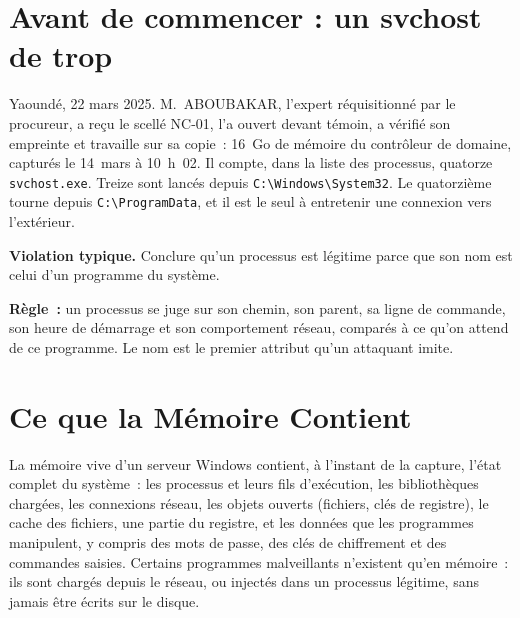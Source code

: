 \bigskip

\section*{Avant de commencer : un svchost de trop}

Yaoundé, 22 mars 2025. M.~ABOUBAKAR, l'expert réquisitionné par le
procureur, a reçu le scellé NC-01, l'a ouvert devant témoin, a vérifié son
empreinte et travaille sur sa copie~: 16~Go de mémoire du contrôleur de
domaine, capturés le 14~mars à 10~h~02. Il compte, dans la liste des
processus, quatorze \texttt{svchost.exe}. Treize sont lancés depuis
\texttt{C:\textbackslash Windows\textbackslash System32}. Le quatorzième
tourne depuis \texttt{C:\textbackslash ProgramData}, et il est le seul à
entretenir une connexion vers l'extérieur.

\begin{boxalert}
\textbf{Violation typique.} Conclure qu'un processus est légitime parce que
son nom est celui d'un programme du système.

\smallskip
\textbf{Règle~:} un processus se juge sur son chemin, son parent, sa ligne de
commande, son heure de démarrage et son comportement réseau, comparés à ce
qu'on attend de ce programme. Le nom est le premier attribut qu'un attaquant
imite.
\end{boxalert}

\separateur

\section{Ce que la Mémoire Contient}
\label{sec:c05-contenu}

La mémoire vive d'un serveur Windows contient, à l'instant de la capture,
l'état complet du système~: les processus et leurs fils d'exécution, les
bibliothèques chargées, les connexions réseau, les objets ouverts (fichiers,
clés de registre), le cache des fichiers, une partie du registre, et les
données que les programmes manipulent, y compris des mots de passe, des clés
de chiffrement et des commandes saisies. Certains programmes malveillants
n'existent qu'en mémoire~: ils sont chargés depuis le réseau, ou injectés
dans un processus légitime, sans jamais être écrits sur le disque.

